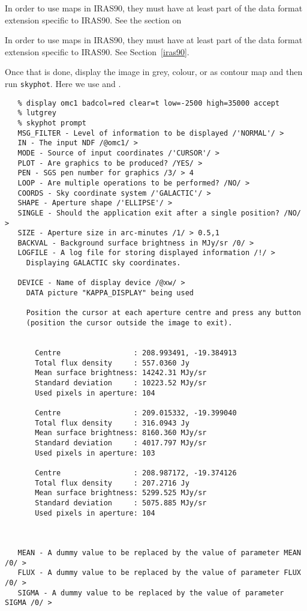 \begin{htmlonly}
   In order to use maps in IRAS90, they must have at least part
   of the data format extension specific to IRAS90. See the section on
\end{htmlonly}
\begin{latexonly}
   In order to use maps in IRAS90, they must have at least part
   of the data format extension specific to IRAS90. See
Section~\ref{iras90}.
\end{latexonly}

   Once that is done, display the image in grey, colour, or as contour
   map and then run {\tt skyphot}. Here we use
{\tt {}}
   and
{\tt {}}.

\begin{verbatim}
   % display omc1 badcol=red clear=t low=-2500 high=35000 accept
   % lutgrey
   % skyphot prompt
   MSG_FILTER - Level of information to be displayed /'NORMAL'/ > 
   IN - The input NDF /@omc1/ > 
   MODE - Source of input coordinates /'CURSOR'/ > 
   PLOT - Are graphics to be produced? /YES/ > 
   PEN - SGS pen number for graphics /3/ > 4
   LOOP - Are multiple operations to be performed? /NO/ > 
   COORDS - Sky coordinate system /'GALACTIC'/ > 
   SHAPE - Aperture shape /'ELLIPSE'/ > 
   SINGLE - Should the application exit after a single position? /NO/ > 
   SIZE - Aperture size in arc-minutes /1/ > 0.5,1
   BACKVAL - Background surface brightness in MJy/sr /0/ > 
   LOGFILE - A log file for storing displayed information /!/ > 
     Displaying GALACTIC sky coordinates.

   DEVICE - Name of display device /@xw/ > 
     DATA picture "KAPPA_DISPLAY" being used

     Position the cursor at each aperture centre and press any button
     (position the cursor outside the image to exit).


       Centre                 : 208.993491, -19.384913
       Total flux density     : 557.0360 Jy
       Mean surface brightness: 14242.31 MJy/sr
       Standard deviation     : 10223.52 MJy/sr
       Used pixels in aperture: 104

       Centre                 : 209.015332, -19.399040
       Total flux density     : 316.0943 Jy
       Mean surface brightness: 8160.360 MJy/sr
       Standard deviation     : 4017.797 MJy/sr
       Used pixels in aperture: 103

       Centre                 : 208.987172, -19.374126
       Total flux density     : 207.2716 Jy
       Mean surface brightness: 5299.525 MJy/sr
       Standard deviation     : 5075.885 MJy/sr
       Used pixels in aperture: 104



   MEAN - A dummy value to be replaced by the value of parameter MEAN /0/ > 
   FLUX - A dummy value to be replaced by the value of parameter FLUX /0/ > 
   SIGMA - A dummy value to be replaced by the value of parameter SIGMA /0/ > 
\end{verbatim}

